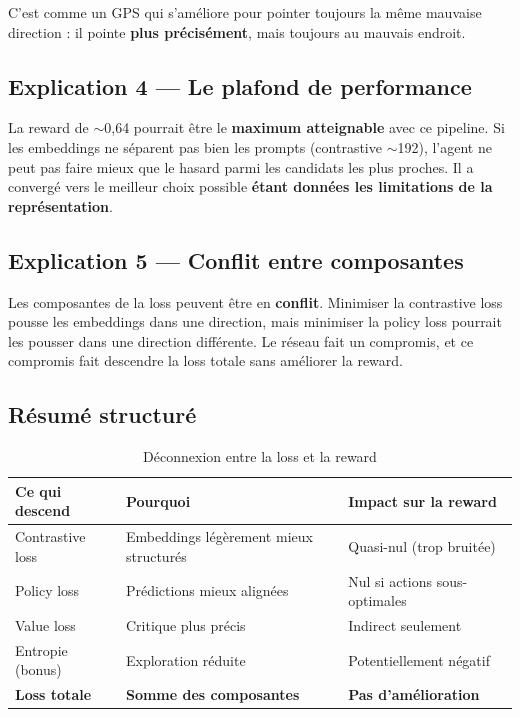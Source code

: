 \documentclass[11pt,a4paper]{article}
\begin{document}
C'est comme un GPS qui s'améliore pour pointer toujours la même mauvaise direction : il pointe \textbf{plus précisément}, mais toujours au mauvais endroit.

\subsection{Explication 4 — Le plafond de performance}

La reward de $\sim$0{,}64 pourrait être le \textbf{maximum atteignable} avec ce pipeline. Si les embeddings ne séparent pas bien les prompts (contrastive $\sim$192), l'agent ne peut pas faire mieux que le hasard parmi les candidats les plus proches. Il a convergé vers le meilleur choix possible \textbf{étant données les limitations de la représentation}.

\subsection{Explication 5 — Conflit entre composantes}

Les composantes de la loss peuvent être en \textbf{conflit}. Minimiser la contrastive loss pousse les embeddings dans une direction, mais minimiser la policy loss pourrait les pousser dans une direction différente. Le réseau fait un compromis, et ce compromis fait descendre la loss totale sans améliorer la reward.

\subsection{Résumé structuré}

\begin{table}[h]
\centering
\renewcommand{\arraystretch}{1.3}
\begin{tabular}{p{4cm} p{4cm} p{4cm}}
\toprule
\textbf{Ce qui descend} & \textbf{Pourquoi} & \textbf{Impact sur la reward} \\
\midrule
Contrastive loss & Embeddings légèrement mieux structurés & Quasi-nul (trop bruitée) \\
Policy loss & Prédictions mieux alignées & Nul si actions sous-optimales \\
Value loss & Critique plus précis & Indirect seulement \\
Entropie (bonus) & Exploration réduite & Potentiellement négatif \\
\midrule
\textbf{Loss totale} & \textbf{Somme des composantes} & \textbf{Pas d'amélioration} \\
\bottomrule
\end{tabular}
\caption{Déconnexion entre la loss et la reward}
\end{table}
\end{document}
